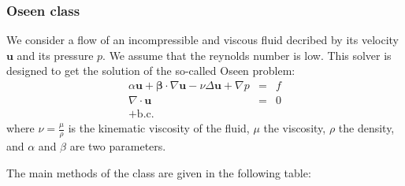 \documentclass[11pt]{article}
\begin{document}
\subsubsection{Oseen class}
We consider a flow of an incompressible and viscous fluid decribed by its velocity $\mathbf{u}$ and its pressure $p$. We assume that the reynolds number is low. This solver is designed to get the solution of the so-called Oseen problem:
\begin{eqnarray}
\alpha\mathbf{u}+\boldsymbol{\beta}\cdot\nabla\mathbf{u}-\nu\Delta\mathbf{u} + \nabla p & = & f\\
\nabla\cdot\mathbf{u} & = & 0\\
+\text{b.c.}\nonumber
\end{eqnarray}
where $\nu=\frac{\mu}{\rho}$ is the kinematic viscosity of the fluid, $\mu$ the viscosity, $\rho$ the density, and $\alpha$ and $\beta$ are two parameters.

The main methods of the class are given in the following table:
\end{document}
